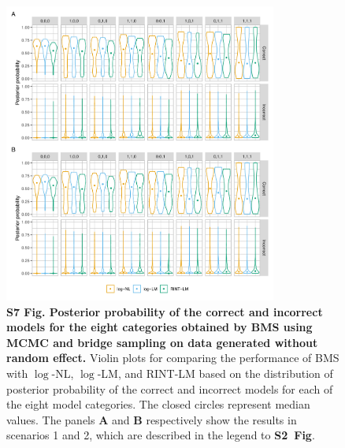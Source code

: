 \documentclass[11pt]{article}
\newcommand{\sfigroccmcmc}{\textbf{S2~Fig}\xspace}
\begin{document}
\begin{figure}[!ht]
\begin{center}
  \includegraphics[width=0.8\textwidth]{png/sim_vln_mcmc_bs1.png}
\end{center}  
\caption{
  {\bf
    S7 Fig.
    Posterior probability of the correct and incorrect models for the eight categories obtained by BMS using MCMC and bridge sampling on data generated without random effect.}
Violin plots for comparing the performance of BMS with $\log$-NL, $\log$-LM, and RINT-LM based on the distribution of posterior probability of the correct and incorrect models for each of the eight model categories. The closed circles represent median values. The panels \textbf{A} and \textbf{B} respectively show the results in scenarios 1 and 2, which are described in the legend to \sfigroccmcmc.
}
\label{s-fig:sim-vln-mcmc1}
\end{figure}
\end{document}
